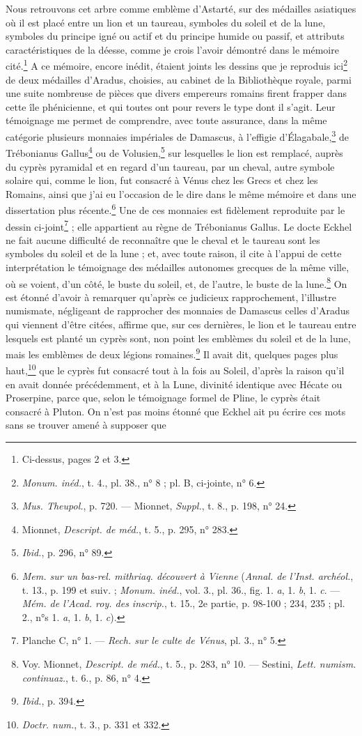 \documentclass[a4paper, 11pt, oneside, polutonikogreek, french]{article}
\begin{document}
Nous retrouvons cet arbre comme emblème d'Astarté, sur des médailles asiatiques où il est placé entre un lion et un taureau, symboles du soleil et de la lune, symboles du principe igné ou actif et du principe humide ou passif, et attributs caractéristiques de la déesse, comme je crois l'avoir démontré dans le mémoire cité.\footnote{Ci-dessus, pages 2 et 3.} A ce mémoire, encore inédit, étaient joints les dessins que je reproduis ici\footnote{\emph{Monum. inéd.}, t. 4., pl. 38., n° 8 ; pl. B, ci-jointe, n° 6.} de deux médailles d'Aradus, choisies, au cabinet de la Bibliothèque royale, parmi une suite nombreuse de pièces que divers empereurs romains firent frapper dans cette île phénicienne, et qui toutes ont pour revers le type dont il s'agit. Leur témoignage me permet de comprendre, avec toute assurance, dans la même catégorie plusieurs monnaies impériales de Damascus, à l'effigie d'Élagabale,\footnote{\emph{Mus. Theupol.}, p. 720. --- Mionnet, \emph{Suppl.}, t. 8., p. 198, n° 24.} de Trébonianus Gallus\footnote{Mionnet, \emph{Descript. de méd.}, t. 5., p. 295, n° 283.} ou de Volusien,\footnote{\emph{Ibid.}, p. 296, n° 89.} sur lesquelles le lion est remplacé, auprès du cyprès pyramidal et en regard d'un taureau, par un cheval, autre symbole solaire qui, comme le lion, fut consacré à Vénus chez les Grecs et chez les Romains, ainsi que j'ai eu l'occasion de le dire dans le même mémoire et dans une dissertation plus récente.\footnote{\emph{Mem. sur un bas-rel. mithriaq. découvert à Vienne} (\emph{Annal. de l'Inst. archéol.}, t. 13., p. 199 et suiv. ; \emph{Monum. inéd.}, vol. 3., pl. 36., fig. 1. \emph{a}, 1. \emph{b}, 1. \emph{c}. --- \emph{Mém. de l'Acad. roy. des inscrip.}, t. 15., 2e partie, p. 98-100 ; 234, 235 ; pl. 2., n°s 1. \emph{a}, 1. \emph{b}, 1. \emph{c}).} Une de ces monnaies est fidèlement reproduite par le dessin ci-joint\footnote{Planche C, n° 1. --- \emph{Rech. sur le culte de Vénus}, pl. 3., n° 5.} ; elle appartient au règne de Trébonianus Gallus. Le docte Eckhel ne fait aucune difficulté de reconnaître que le cheval et le taureau sont les symboles du soleil et de la lune ; et, avec toute raison, il cite à l'appui de cette interprétation le témoignage des médailles autonomes grecques de la même ville, où se voient, d'un côté, le buste du soleil, et, de l'autre, le buste de la lune.\footnote{Voy. Mionnet, \emph{Descript. de méd.}, t. 5., p. 283, n° 10. --- Sestini, \emph{Lett. numism. continuaz.}, t. 6., p. 86, n° 4.} On est étonné d'avoir à remarquer qu'après ce judicieux rapprochement, l'illustre numismate, négligeant de rapprocher des monnaies de Damascus celles d'Aradus qui viennent d'être citées, affirme que, sur ces dernières, le lion et le taureau entre lesquels est planté un cyprès sont, non point les emblèmes du soleil et de la lune, mais les emblèmes de deux légions romaines.\footnote{\emph{Ibid.}, p. 394.} Il avait dit, quelques pages plus haut,\footnote{\emph{Doctr. num.}, t. 3., p. 331 et 332.} que le cyprès fut consacré tout à la fois au Soleil, d'après la raison qu'il en avait donnée précédemment, et à la Lune, divinité identique avec Hécate ou Proserpine, parce que, selon le témoignage formel de Pline, le cyprès était consacré à Pluton. On n'est pas moins étonné que Eckhel ait pu écrire ces mots sans se trouver amené à supposer que 
\end{document}
